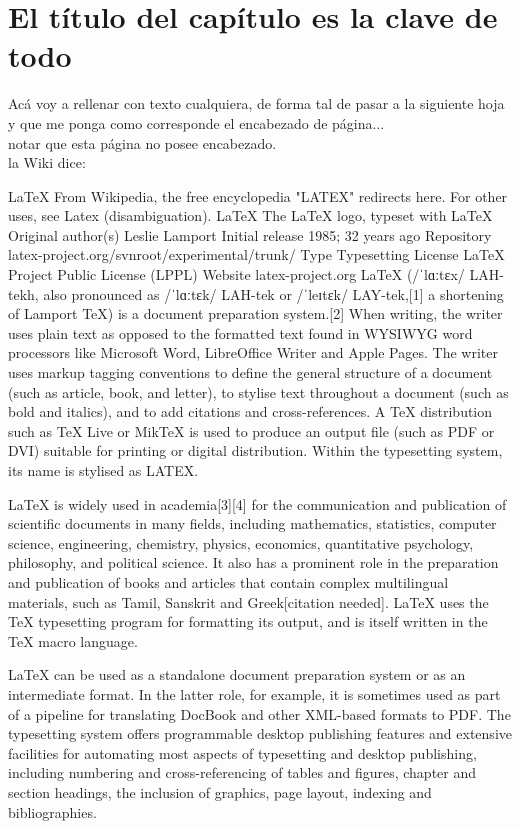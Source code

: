 \chapter{El título del capítulo es la clave de todo}
  Acá voy a rellenar con texto cualquiera, de forma tal de pasar a la siguiente hoja y que me ponga como corresponde el encabezado de página...\\

  notar que esta página no posee encabezado.\\

  la Wiki dice:

  LaTeX
From Wikipedia, the free encyclopedia
"LATEX" redirects here. For other uses, see Latex (disambiguation).
LaTeX
The LaTeX logo, typeset with LaTeX
Original author(s)	Leslie Lamport
Initial release	1985; 32 years ago
Repository	latex-project.org/svnroot/experimental/trunk/
Type	Typesetting
License	LaTeX Project Public License (LPPL)
Website	latex-project.org
LaTeX (/ˈlɑːtɛx/ LAH-tekh, also pronounced as /ˈlɑːtɛk/ LAH-tek or /ˈleɪtɛk/ LAY-tek,[1] a shortening of Lamport TeX) is a document preparation system.[2] When writing, the writer uses plain text as opposed to the formatted text found in WYSIWYG word processors like Microsoft Word, LibreOffice Writer and Apple Pages. The writer uses markup tagging conventions to define the general structure of a document (such as article, book, and letter), to stylise text throughout a document (such as bold and italics), and to add citations and cross-references. A TeX distribution such as TeX Live or MikTeX is used to produce an output file (such as PDF or DVI) suitable for printing or digital distribution. Within the typesetting system, its name is stylised as LATEX.

LaTeX is widely used in academia[3][4] for the communication and publication of scientific documents in many fields, including mathematics, statistics, computer science, engineering, chemistry, physics, economics, quantitative psychology, philosophy, and political science. It also has a prominent role in the preparation and publication of books and articles that contain complex multilingual materials, such as Tamil, Sanskrit and Greek[citation needed]. LaTeX uses the TeX typesetting program for formatting its output, and is itself written in the TeX macro language.

LaTeX can be used as a standalone document preparation system or as an intermediate format. In the latter role, for example, it is sometimes used as part of a pipeline for translating DocBook and other XML-based formats to PDF. The typesetting system offers programmable desktop publishing features and extensive facilities for automating most aspects of typesetting and desktop publishing, including numbering and cross-referencing of tables and figures, chapter and section headings, the inclusion of graphics, page layout, indexing and bibliographies.

